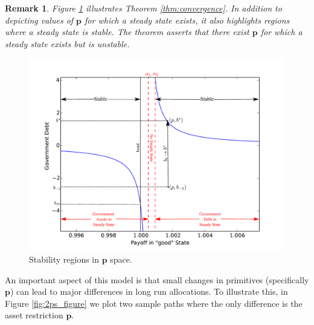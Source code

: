 \documentclass[12pt]{article}
\newtheorem{remark}[theorem]{Remark}
\begin{document}
\begin{remark}  Figure \ref{fig:stable} illustrates  Theorem \ref{thm:convergence}.  In addition to depicting values of $\bm p$ for which a steady state exists, it  also highlights  regions where a steady state is stable. The theorem asserts  that there exist $\bm p$ for which a steady state exists
but is unstable. %
\end{remark}
\begin{figure}[ht]
		\begin{center}
		\includegraphics[width = 5in]{Images/graph_stable.pdf}
\caption{Stability regions in $\bm p$ space.\label{fig:stable}}
	\end{center}	
\end{figure}  An important aspect of this model is that small changes in primitives (specifically $\bm p$) can lead to major differences in long run allocations.  To illustrate this, in Figure \ref{fig:2ps_figure} we plot two sample paths where the only difference is the asset restriction $\bm p$.
\end{document}
